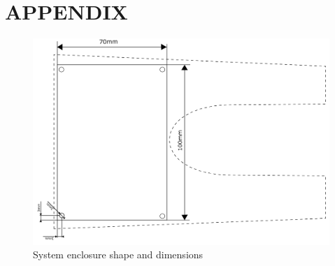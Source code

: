 \section{APPENDIX}
\label{sec:app}

\begin{figure}[htb]
	\centering
    \includegraphics[width=\linewidth]{Figures/casing_dimensions.png}
	\caption{System enclosure shape and dimensions}
	\label{fig:casdim}
\end{figure}




